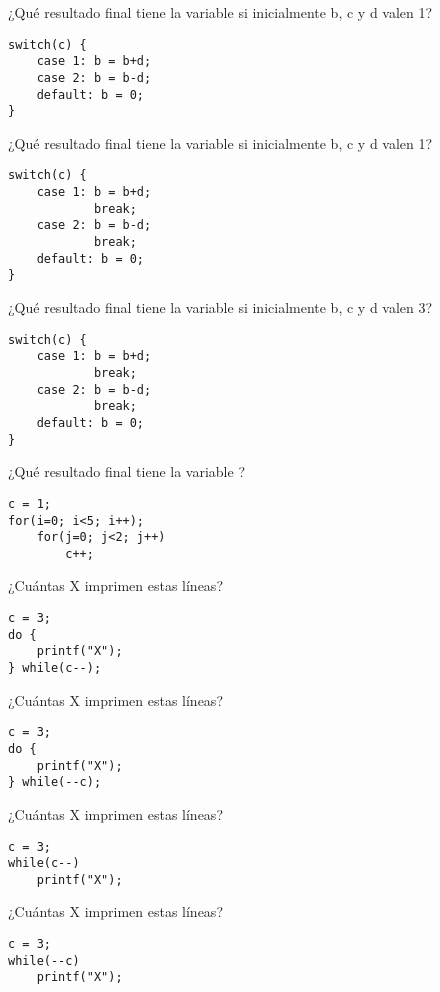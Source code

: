 \begin{preguntas}
\question ¿Qué resultado final tiene la variable  si inicialmente b, c y d valen 1?
\begin{lstlisting}
switch(c) {
	case 1: b = b+d;
	case 2: b = b-d;
	default: b = 0;
}
\end{lstlisting}

\question ¿Qué resultado final tiene la variable  si inicialmente b, c y d valen 1?
\begin{lstlisting}
switch(c) {
	case 1: b = b+d;
			break;
	case 2: b = b-d;
			break;
	default: b = 0;
}
\end{lstlisting}

\question ¿Qué resultado final tiene la variable  si inicialmente b, c y d valen 3?
\begin{lstlisting}
switch(c) {
	case 1: b = b+d;
			break;
	case 2: b = b-d;
			break;
	default: b = 0;
}
\end{lstlisting}

\question ¿Qué resultado final tiene la variable ?
\begin{lstlisting}
c = 1;
for(i=0; i<5; i++);
	for(j=0; j<2; j++)    
		c++;
\end{lstlisting}

\question ¿Cuántas X imprimen estas líneas?
\begin{lstlisting}
c = 3; 
do {
	printf("X");
} while(c--);
\end{lstlisting}

\question ¿Cuántas X imprimen estas líneas?
\begin{lstlisting}
c = 3; 
do { 
	printf("X"); 
} while(--c);
\end{lstlisting}

\question ¿Cuántas X imprimen estas líneas?
\begin{lstlisting}
c = 3; 
while(c--) 
	printf("X"); 
\end{lstlisting}

\question ¿Cuántas X imprimen estas líneas?
\begin{lstlisting}
c = 3; 
while(--c) 
	printf("X");
\end{lstlisting}
\end{preguntas}
